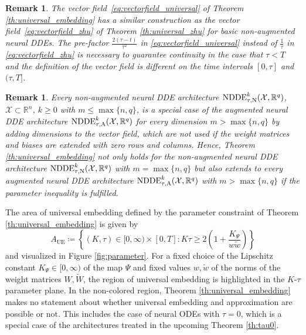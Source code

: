 \documentclass[10pt]{article}
\numberwithin{equation}{section}
\newtheorem{remark}[theorem]{Remark}
\begin{document}
	\begin{remark} \label{rem:universal}
		The vector field~\eqref{eq:vectorfield_universal} of Theorem \ref{th:universal_embedding} has a similar construction as the vector field~\eqref{eq:vectorfield_zhu} of Theorem \ref{th:universal_zhu} for basic non-augmented neural DDEs. The pre-factor $\frac{2(\tau-t)}{\tau^2}$ in \eqref{eq:vectorfield_universal} instead of $\frac{1}{\tau}$ in \eqref{eq:vectorfield_zhu} is necessary to guarantee continuity in the case that $\tau <T$ and the definition of the vector field is different on the time intervals $[0,\tau]$ and $(\tau,T]$.
	\end{remark}
	
	\begin{remark}\label{rem:universal2}
		Every non-augmented neural DDE architecture $\textup{NDDE}^k_{\tau,\textup{N}}(\mathcal{X},\mathbb{R}^q)$, $\mathcal{X} \subset \mathbb{R}^n$, $k \geq 0$  with $m \leq \max\{n,q\}$, is a special case of the augmented neural DDE architecture $\textup{NDDE}^k_{\tau,\textup{A}}(\mathcal{X},\mathbb{R}^q)$ for every dimension $m > \max\{n,q\}$ by adding dimensions to the vector field, which are not used if the weight matrices and biases are extended with zero rows and columns. Hence, Theorem \ref{th:universal_embedding} not only holds for the non-augmented neural DDE architecture $\textup{NDDE}^k_{\tau,\textup{N}}(\mathcal{X},\mathbb{R}^q)$ with $m = \max\{n,q\}$ but also extends to every augmented neural DDE architecture  $\textup{NDDE}^k_{\tau,\textup{A}}(\mathcal{X},\mathbb{R}^q)$ with $m > \max\{n,q\}$ if the parameter inequality is fulfilled.
	\end{remark}
	
	
	The area of universal embedding defined by the parameter constraint of Theorem \ref{th:universal_embedding} is given by
	\begin{equation*}
		A_\text{UE} \coloneqq \left\{(K,\tau) \in [0,\infty) \times [0,T]: K \tau \geq2\left(1+\frac{K_\Psi}{w \tilde{w}}\right)\right\} 
	\end{equation*}
	and visualized in Figure \ref{fig:parameter}. For a fixed choice of the Lipschitz constant $K_\Psi\in[0,\infty)$ of the map $\Psi$ and fixed values $w,\tilde w$ of the norms of the weight matrices $W,\widetilde{W}$, the region of universal embedding is highlighted in the $K$-$\tau$ parameter plane. In the non-colored region, Theorem \ref{th:universal_embedding} makes no statement about whether universal embedding and approximation are possible or not. This includes the case of neural ODEs with $\tau = 0$, which is a special case of the architectures treated in the upcoming Theorem \ref{th:tau0}.
	
\end{document}
